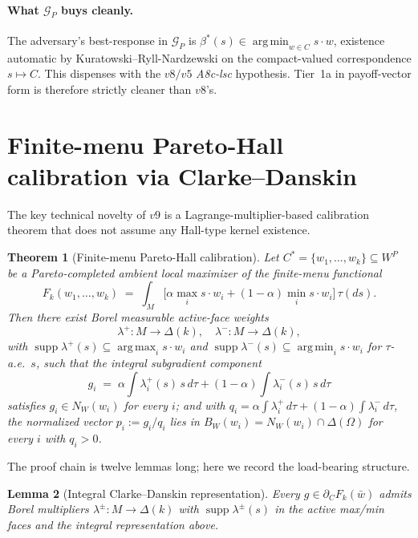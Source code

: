 \documentclass[11pt]{article}
\newtheorem{theorem}{Theorem}
\newtheorem{lemma}[theorem]{Lemma}
\theoremstyle{definition}
\theoremstyle{remark}
\newcommand{\Om}{\Omega}
\newcommand{\suppset}{\operatorname{supp}}
\newcommand{\argmin}{\operatorname*{arg\,min}}
\newcommand{\argmax}{\operatorname*{arg\,max}}
\begin{document}
\paragraph{What $\mathcal G_P$ buys cleanly.} The adversary's
best-response in $\mathcal G_P$ is $\beta^*(s)\in\argmin_{w\in C}s\!\cdot w$,
existence automatic by Kuratowski--Ryll-Nardzewski on the compact-valued
correspondence $s\mapsto C$. This dispenses with the $v8/v5$ \emph{A8c-lsc}
hypothesis. Tier~1a in payoff-vector form is therefore strictly cleaner
than $v8$'s.

\section{Finite-menu Pareto-Hall calibration via Clarke--Danskin}\label{sec:t1}

The key technical novelty of $v9$ is a Lagrange-multiplier-based
calibration theorem that does not assume any Hall-type kernel
existence.

\begin{theorem}[Finite-menu Pareto-Hall calibration]\label{thm:T1}
Let $C^* = \{w_1,\ldots,w_k\}\subseteq W^P$ be a Pareto-completed ambient
local maximizer of the finite-menu functional
\[
  F_k(w_1,\ldots,w_k) \;=\; \int_M\!\big[\alpha\max_i s\!\cdot w_i + (1-\alpha)\min_i s\!\cdot w_i\big]\,\tau(ds).
\]
Then there exist Borel measurable active-face weights
\[
  \lambda^+:M\to\Delta(k),\quad \lambda^-:M\to\Delta(k),
\]
with $\suppset\lambda^+(s)\subseteq\argmax_i s\!\cdot w_i$ and
$\suppset\lambda^-(s)\subseteq\argmin_i s\!\cdot w_i$ for $\tau$-a.e.\ $s$,
such that the integral subgradient component
\[
  g_i \;=\; \alpha\!\int\lambda^+_i(s)\,s\,d\tau + (1-\alpha)\!\int\lambda^-_i(s)\,s\,d\tau
\]
satisfies $g_i\in N_W(w_i)$ for every $i$; and with
$q_i = \alpha\!\int\lambda^+_i\,d\tau + (1-\alpha)\!\int\lambda^-_i\,d\tau$,
the normalized vector $p_i := g_i/q_i$ lies in $B_W(w_i) = N_W(w_i)\cap\Delta(\Om)$
for every $i$ with $q_i > 0$.
\end{theorem}

\noindent The proof chain is twelve lemmas long; here we record the
load-bearing structure.

\begin{lemma}[Integral Clarke--Danskin representation]\label{lem:L6}
Every $g\in\partial_C F_k(\bar w)$ admits Borel multipliers
$\lambda^\pm:M\to\Delta(k)$ with $\suppset\lambda^\pm(s)$ in the active
max/min faces and the integral representation above.
\end{lemma}
\end{document}
